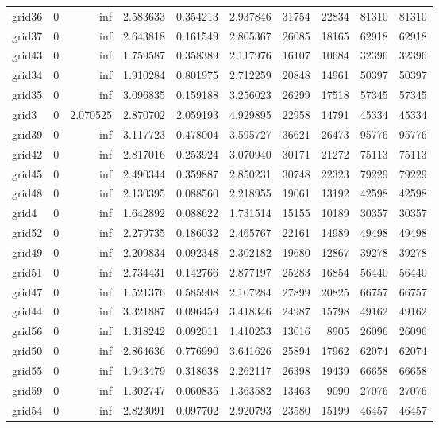 \begin{longtable}{|l|r|r|r|r|r|r|r|r|r|}
grid36 & 0 & inf & 2.583633 & 0.354213 & 2.937846 & 31754 & 22834 & 81310 & 81310 \\
grid37 & 0 & inf & 2.643818 & 0.161549 & 2.805367 & 26085 & 18165 & 62918 & 62918 \\
grid43 & 0 & inf & 1.759587 & 0.358389 & 2.117976 & 16107 & 10684 & 32396 & 32396 \\
grid34 & 0 & inf & 1.910284 & 0.801975 & 2.712259 & 20848 & 14961 & 50397 & 50397 \\
grid35 & 0 & inf & 3.096835 & 0.159188 & 3.256023 & 26299 & 17518 & 57345 & 57345 \\
grid3 & 0 & 2.070525 & 2.870702 & 2.059193 & 4.929895 & 22958 & 14791 & 45334 & 45334 \\
grid39 & 0 & inf & 3.117723 & 0.478004 & 3.595727 & 36621 & 26473 & 95776 & 95776 \\
grid42 & 0 & inf & 2.817016 & 0.253924 & 3.070940 & 30171 & 21272 & 75113 & 75113 \\
grid45 & 0 & inf & 2.490344 & 0.359887 & 2.850231 & 30748 & 22323 & 79229 & 79229 \\
grid48 & 0 & inf & 2.130395 & 0.088560 & 2.218955 & 19061 & 13192 & 42598 & 42598 \\
grid4 & 0 & inf & 1.642892 & 0.088622 & 1.731514 & 15155 & 10189 & 30357 & 30357 \\
grid52 & 0 & inf & 2.279735 & 0.186032 & 2.465767 & 22161 & 14989 & 49498 & 49498 \\
grid49 & 0 & inf & 2.209834 & 0.092348 & 2.302182 & 19680 & 12867 & 39278 & 39278 \\
grid51 & 0 & inf & 2.734431 & 0.142766 & 2.877197 & 25283 & 16854 & 56440 & 56440 \\
grid47 & 0 & inf & 1.521376 & 0.585908 & 2.107284 & 27899 & 20825 & 66757 & 66757 \\
grid44 & 0 & inf & 3.321887 & 0.096459 & 3.418346 & 24987 & 15798 & 49162 & 49162 \\
grid56 & 0 & inf & 1.318242 & 0.092011 & 1.410253 & 13016 & 8905 & 26096 & 26096 \\
grid50 & 0 & inf & 2.864636 & 0.776990 & 3.641626 & 25894 & 17962 & 62074 & 62074 \\
grid55 & 0 & inf & 1.943479 & 0.318638 & 2.262117 & 26398 & 19439 & 66658 & 66658 \\
grid59 & 0 & inf & 1.302747 & 0.060835 & 1.363582 & 13463 & 9090 & 27076 & 27076 \\
grid54 & 0 & inf & 2.823091 & 0.097702 & 2.920793 & 23580 & 15199 & 46457 & 46457 \\

\end{longtable}

